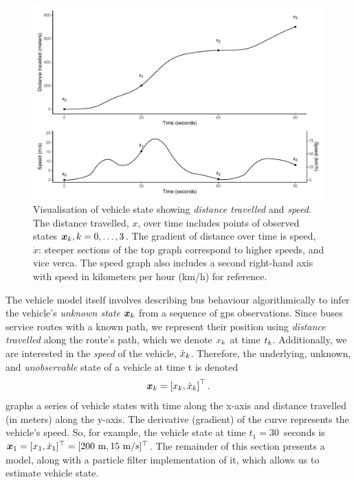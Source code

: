 \begin{knitrout}\small
{}\color{fgcolor}\begin{figure}

{\centering \includegraphics[width=\textwidth]{figure/vehicle_state-1} 

}

\caption[Visualisation of vehicle state showing \emph{distance travelled} and \emph{speed}]{Visualisation of vehicle state showing \emph{distance travelled} and \emph{speed}. The distance travelled, $x$, over time includes points of observed states $\boldsymbol x_k, k=0,\ldots,3$. The gradient of distance over time is speed, $\dot x$: steeper sections of the top graph correspond to higher speeds, and vice verca. The speed graph also includes a second right-hand axis with speed in kilometers per hour (km/h) for reference.}\label{fig:vehicle_state}
\end{figure}


\end{knitrout}

The vehicle model itself involves describing bus behaviour algorithmically to infer the vehicle's \emph{unknown state} $\boldsymbol x_k$ from a sequence of \gls{gps} observations. Since buses service routes with a known path, we represent their position using \emph{distance travelled} along the route's path, which we denote $x_k$ at time $t_k$. Additionally, we are interested in the \emph{speed} of the vehicle, $\dot x_k$. Therefore, the underlying, unknown, and \emph{unobservable} state of a vehicle at time t is denoted
\begin{equation}
\label{eq:vehicle_state}
\boldsymbol x_k = \left[x_k, \dot x_k\right]^\top.
\end{equation}
 graphs a series of vehicle states with time along the x-axis and distance travelled (in meters) along the y-axis. The derivative (gradient) of the curve represents the vehicle's speed. So, for example, the vehicle state at time $t_1 = 30$~seconds is $\boldsymbol x_1 = [x_1, \dot x_1]^\top = [200~\text{m}, 15~\text{m/s}]^\top$. The remainder of this section presents a model, along with a particle filter implementation of it, which allows us to estimate vehicle state.


